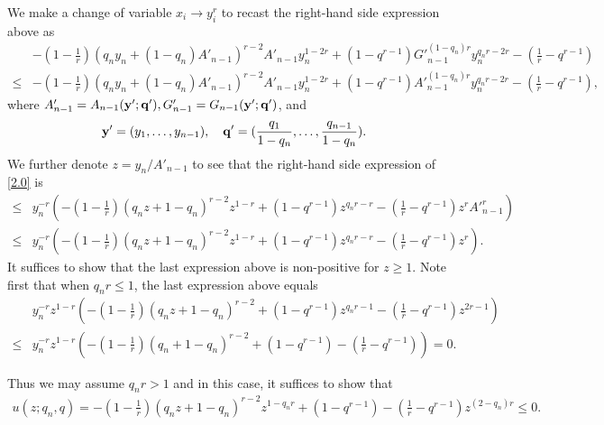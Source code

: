 \documentclass[11pt]{amsart}
\numberwithin{equation}{section}
\theoremstyle{definition}
\theoremstyle{remark}
\begin{document}
   We make a change of variable $x_i \rightarrow y^r_i$ to recast the right-hand side expression above as
\begin{align}
\label{2.0}
 & -(1-\frac {1}{r})(q_ny_n+(1-q_n)A'_{n-1})^{r-2}A'_{n-1}y^{1-2r}_n+(1-q^{r-1}){G'}^{(1-	q_n)r}_{n-1}y^{q_nr-2r}_n-(\frac 1r-q^{r-1}) \\
\leq & -(1-\frac {1}{r})(q_ny_n+(1-q_n)A'_{n-1})^{r-2}A'_{n-1}y^{1-2r}_n+(1-q^{r-1}){A'}^{(1-	q_n)r}_{n-1}y^{q_nr-2r}_n-(\frac 1r-q^{r-1}),  \nonumber
\end{align}
   where $A'_{n-1}=A_{n-1}({\bf y'}; {\bf q'}), G'_{n-1}=G_{n-1}({\bf y'}; {\bf q'})$, and
\begin{align*}
   {\bf y'}=(y_1, \ldots, y_{n-1}), \quad {\bf q'}=(\frac {q_1}{1-q_n}, \ldots,
   \frac {q_{n-1}}{1-q_n}).
\end{align*}
   We further denote $z=y_n/A'_{n-1}$ to see that the right-hand side expression of \eqref{2.0} is
\begin{align*}
\leq & y^{-r}_n \left (  -(1-\frac {1}{r})(q_nz+1-q_n)^{r-2}z^{1-r}+(1-q^{r-1})z^{q_nr-r}-(\frac 1r-q^{r-1})z^r{A'}^{r}_{n-1} \right ) \\
\leq & y^{-r}_n \left (  -(1-\frac {1}{r})(q_nz+1-q_n)^{r-2}z^{1-r}+(1-q^{r-1})z^{q_nr-r}-(\frac 1r-q^{r-1})z^r \right ).
\end{align*}
   It suffices to show that the last expression above is non-positive for $z \geq 1$. Note first that when $q_nr \leq 1$, the last expression above equals
\begin{align*}
 &  y^{-r}_nz^{1-r} \left (  -(1-\frac {1}{r})(q_nz+1-q_n)^{r-2}+(1-q^{r-1})z^{q_nr-1}-(\frac 1r-q^{r-1})z^{2r-1} \right ) \\
\leq & y^{-r}_nz^{1-r} \left (  -(1-\frac {1}{r})(q_n+1-q_n)^{r-2}+(1-q^{r-1})-(\frac 1r-q^{r-1}) \right ) =0.
\end{align*}

  Thus we may assume $q_nr>1$ and in this case, it suffices to show that
\begin{align*}
   u(z;q_n, q)=
   -(1-\frac {1}{r})(q_nz+1-q_n)^{r-2}z^{1-q_nr}+(1-q^{r-1})-(\frac 1r-q^{r-1})z^{(2-q_n)r} \leq 0.
\end{align*}
\end{document}
